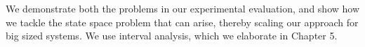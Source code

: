 We demonstrate both the problems in our experimental evaluation, 
and show how we tackle the state space problem that can arise, thereby scaling our approach for big sized systems. 
We use interval analysis, which we elaborate in Chapter 5. 

















